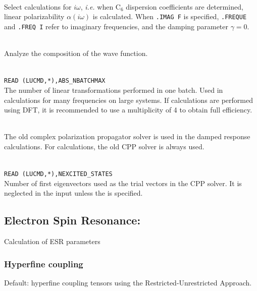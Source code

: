 \begin{description}
\item{} \\
   Select calculations for $i\omega$, {\it i.e.} when C$_6$ dispersion
coefficients are determined, linear polarizability $\alpha(i\omega)$ is
calculated. When \verb|.IMAG F| is specified, \verb|.FREQUE| and \verb|.FREQ I|
refer to imaginary frequencies, and the damping
parameter $\gamma = 0$.

\item{} \\
   Analyze the composition of the wave function.

\item{}     \\
\verb|READ (LUCMD,*),ABS_NBATCHMAX|\\
   The number of linear transformations performed in one batch. Used in
calculations for many frequencies on large systems.
If calculations are performed using DFT, it is recommended to use
a multiplicity of 4 to obtain full efficiency.

\item{}\\
 The old complex polarization propagator
solver \cite{pndmbhjajjojcp123,pndmbhjajjojcp115} is used
in the damped response calculations. For {} calculations, the
old CPP solver is always used.
\item{}\\
\verb|READ (LUCMD,*),NEXCITED_STATES|\\
 Number of first eigenvectors used as the trial vectors in the CPP solver.
It is neglected in the input unless the
{} is specified.

\end{description}
\subsection{Electron Spin Resonance: }

Calculation of ESR parameters

\subsubsection{Hyperfine coupling}

Default: hyperfine coupling tensors using
the Restricted-Unrestricted Approach.

